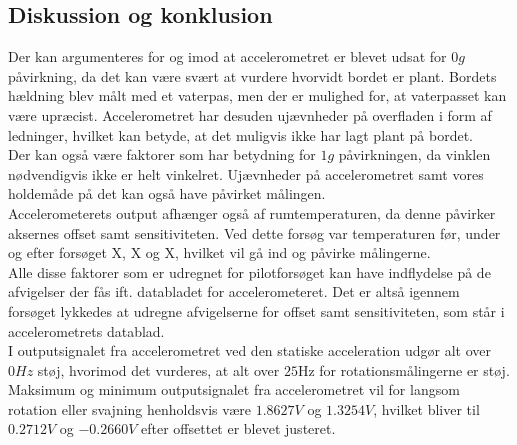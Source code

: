 \subsection{Diskussion og konklusion}
Der kan argumenteres for og imod at accelerometret er blevet udsat for $0g$ påvirkning, da det kan være svært at vurdere hvorvidt bordet er plant. Bordets hældning blev målt med et vaterpas, men der er mulighed for, at vaterpasset kan være upræcist. Accelerometret har desuden ujævnheder på overfladen i form af ledninger, hvilket kan betyde, at det muligvis ikke har lagt plant på bordet. \\
Der kan også være faktorer som har betydning for $1g$ påvirkningen, da vinklen nødvendigvis ikke er helt vinkelret. Ujævnheder på accelerometret samt vores holdemåde på det kan også have påvirket målingen. \\
Accelerometerets output afhænger også af rumtemperaturen, da denne påvirker aksernes offset samt sensitiviteten. Ved dette forsøg var temperaturen før, under og efter forsøget X, X og X, hvilket vil gå ind og påvirke målingerne. \\
Alle disse faktorer som er udregnet for pilotforsøget kan have indflydelse på de afvigelser der fås ift. databladet for accelerometeret. Det er altså igennem forsøget lykkedes at udregne afvigelserne for offset samt sensitiviteten, som står i accelerometrets datablad.  \\

I outputsignalet fra accelerometret ved den statiske acceleration udgør alt over $0Hz$ støj, hvorimod det vurderes, at alt over $25$Hz for rotationsmålingerne er støj. Maksimum og minimum outputsignalet fra accelerometret vil for langsom rotation eller svajning henholdsvis være $1.8627V$ og $1.3254V$, hvilket bliver til $0.2712V$ og $-0.2660V$ efter offsettet er blevet justeret. \\